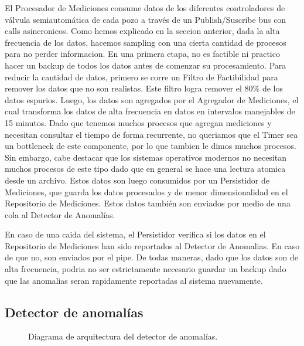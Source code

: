 \documentclass{article}
\theoremstyle{definition}
\theoremstyle{remark}
\begin{document}
El Procesador de Mediciones consume datos de los diferentes controladores de válvula semiautomática de cada pozo a través de un Publish/Suscribe bus con calls asincronicos. Como hemos explicado en la seccion anterior, dada la alta frecuencia de los datos, hacemos sampling con una cierta cantidad de procesos para no perder informacion. En una primera etapa, no es factible ni practico hacer un backup de todos los datos antes de comenzar su procesamiento. Para reducir la cantidad de datos, primero se corre un Filtro de Factibilidad para remover los datos que no son realistas. Este filtro logra remover el 80\% de los datos espurios. Luego, los datos son agregados por el Agregador de Mediciones, el cual transforma los datos de alta frecuencia en datos en intervalos manejables de 15 minutos. Dado que tenemos muchos procesos que agregan mediciones y necesitan consultar el tiempo de forma recurrente, no queriamos que el Timer sea un bottleneck de este componente, por lo que tambien le dimos muchos procesos. Sin embargo, cabe destacar que los sistemas operativos modernos no necesitan muchos procesos de este tipo dado que en general se hace una lectura atomica desde un archivo. Estos datos son luego consumidos por un Persistidor de Mediciones, que guarda los datos procesados y de menor dimensionalidad en el Repositorio de Mediciones. Estos datos también son enviados por medio de una cola al Detector de Anomalías.

En caso de una caida del sistema, el Persistidor verifica si los datos en el Repositorio de Mediciones han sido reportados al Detector de Anomalias. En caso de que no, son enviados por el pipe. De todas maneras, dado que los datos son de alta frecuencia, podria no ser estrictamente necesario guardar un backup dado que las anomalias seran rapidamente reportadas al sistema nuevamente.

\subsection{Detector de anomalías} \label{detector_anomalias}

\begin{figure}[H]
  \caption{Diagrama de arquitectura del detector de anomalías.}
\end{figure}
\end{document}
